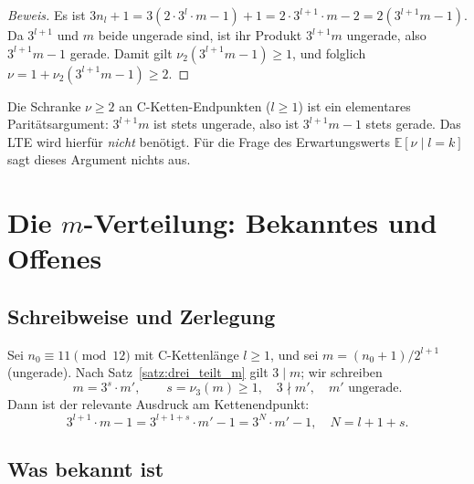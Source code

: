 \documentclass[12pt,a4paper]{article}
\newenvironment{beweis}{\begin{proof}[Beweis]}{\end{proof}}
\newcommand{\vii}{\nu_2}
\newcommand{\viii}{\nu_3}
\newcommand{\E}{\mathbb{E}}
\begin{document}
\begin{beweis}
Es ist $3n_l + 1 = 3(2 \cdot 3^l \cdot m - 1) + 1 = 2 \cdot 3^{l+1} \cdot m - 2 = 2(3^{l+1}m - 1)$.
Da $3^{l+1}$ und $m$ beide ungerade sind, ist ihr Produkt $3^{l+1}m$ ungerade,
also $3^{l+1}m - 1$ gerade.
Damit gilt $\vii(3^{l+1}m - 1) \geq 1$, und folglich
$\nu = 1 + \vii(3^{l+1}m - 1) \geq 2$.
\end{beweis}

\begin{tcolorbox}[ergebnis, title={Beweisbarer Satz -- Trivialität von $\nu \geq 2$}]
Die Schranke $\nu \geq 2$ an C-Ketten-Endpunkten ($l \geq 1$) ist ein
elementares Paritätsargument: $3^{l+1}m$ ist stets ungerade, also ist
$3^{l+1}m - 1$ stets gerade.
Das LTE wird hierfür \emph{nicht} benötigt.
Für die Frage des Erwartungswerts $\E[\nu \mid l{=}k]$ sagt dieses Argument
nichts aus.
\end{tcolorbox}

\section{Die \texorpdfstring{$m$}{m}-Verteilung: Bekanntes und Offenes}
\label{sec:m_verteilung}

\subsection{Schreibweise und Zerlegung}

Sei $n_0 \equiv 11 \pmod{12}$ mit C-Kettenlänge $l \geq 1$,
und sei $m = (n_0 + 1)/2^{l+1}$ (ungerade).
Nach Satz~\ref{satz:drei_teilt_m} gilt $3 \mid m$; wir schreiben
\[
  m = 3^s \cdot m', \qquad s = \viii(m) \geq 1, \quad 3 \nmid m', \quad m' \text{ ungerade}.
\]
Dann ist der relevante Ausdruck am Kettenendpunkt:
\[
  3^{l+1} \cdot m - 1 = 3^{l+1+s} \cdot m' - 1 = 3^N \cdot m' - 1,
  \quad N = l + 1 + s.
\]

\subsection{Was bekannt ist}
\end{document}
